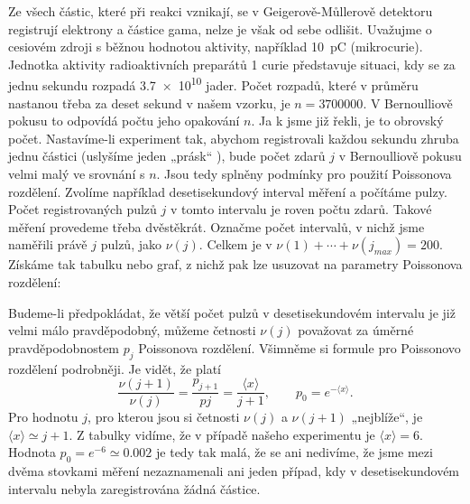 \begin{example}
  Ze všech částic, které při reakci vznikají, se v Geigerově-Můllerově detektoru registrují 
  elektrony a částice gama, nelze je však od sebe odlišit. Uvažujme o cesiovém zdroji s běžnou 
  hodnotou aktivity, například \SI{10}{\pico\coulomb} (mikrocurie). Jednotka aktivity 
  radioaktivních preparátů \num{1} curie představuje situaci, kdy se za jednu sekundu rozpadá 
  \num{3.7e10} jader. Počet rozpadů, které v průměru nastanou třeba za deset sekund v našem vzorku, 
  je \(n = \num{3700000}\). V Bernoulliově pokusu to odpovídá počtu jeho opakování \(n\). Ja k jsme 
  již řekli, je to obrovský počet. Nastavíme-li experiment tak, abychom registrovali každou sekundu 
  zhruba jednu částici (uslyšíme jeden „prásk“ ), bude počet zdarů \(j\) v Bernoulliově pokusu 
  velmi malý ve srovnání s \(n\). Jsou tedy splněny podmínky pro použití Poissonova rozdělení. 
  Zvolíme například desetisekundový interval měření a počítáme pulzy. Počet registrovaných pulzů 
  \(j\) v tomto intervalu je roven počtu zdarů. Takové měření provedeme třeba dvěstěkrát.
  Označme počet intervalů, v nichž jsme naměřili právě \(j\) pulzů, jako \(\nu(j)\). Celkem je v 
  \(\nu(1) + \cdots + \nu(j_{max}) = \num{200}\). Získáme tak tabulku nebo graf, z nichž pak lze 
  usuzovat na parametry Poissonova rozdělení:
  \begin{table}[ht!]
    \centering
  \end{table}
  Budeme-li předpokládat, že větší počet pulzů v desetisekundovém intervalu je již velmi málo 
  pravděpodobný, můžeme četnosti \(\nu(j)\) považovat za úměrné pravděpodobnostem \(p_j\) 
  Poissonova rozdělení. Všimněme si formule pro Poissonovo rozdělení podrobněji. Je vidět, že platí
  \begin{equation*}
    \dfrac{\nu(j + 1)}{\nu(j)} = \dfrac{p_{j+1}}{p{j}} = \dfrac{\langle x \rangle}{j + 1},
    \qquad p_0 = e^{-\langle x \rangle}.
  \end{equation*}
  Pro hodnotu \(j\), pro kterou jsou si četnosti \(\nu(j)\) a \(\nu(j + 1)\) „nejblíže“, je 
  \(\langle x \rangle \simeq j + 1\). Z tabulky vidíme, že v případě našeho experimentu je 
  \(\langle x \rangle = 6\). Hodnota \(p_0 = e^{-6} \simeq \num{0.002}\) je tedy tak malá, že se 
  ani nedivíme, že jsme mezi dvěma stovkami měření nezaznamenali ani jeden případ, kdy v 
  desetisekundovém intervalu nebyla zaregistrována žádná částice.
  

\end{example}
